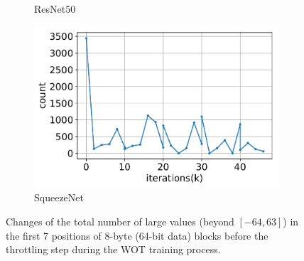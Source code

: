\documentclass{article}
\begin{document}
\begin{figure}[t]
\begin{subfigure}{.32\textwidth}
    \caption{ResNet50}
  \end{subfigure}
  \begin{subfigure}{.32\textwidth}
    \includegraphics[width=\textwidth]{NeuRIPS2019/images/WOT_new/squeezenet1_0_counts.pdf}
    \caption{SqueezeNet}
  \end{subfigure}
  \vspace{-0.08in}
  \caption{Changes of the total number of large values (beyond $[-64, 63]$) in the first 7 positions of 8-byte (64-bit data) blocks before the throttling step during the WOT training process.}
  \label{fig:large_weight_change}
\end{figure}
\end{document}
